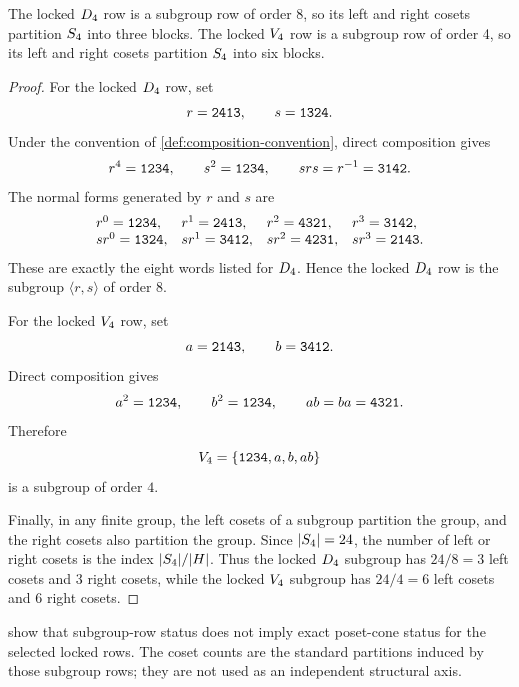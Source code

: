 \begin{corollary}
\label{cor:d4-v4-subgroup-cosets}
The locked \(D_4\) row is a subgroup row of order 8, so its left and right cosets partition \(S_4\) into three blocks. The locked \(V_4\) row is a subgroup row of order 4, so its left and right cosets partition \(S_4\) into six blocks.
\end{corollary}

\begin{proof}
For the locked \(D_4\) row, set
\[
  r=\texttt{2413},\qquad s=\texttt{1324}.
\]
Under the convention of \cref{def:composition-convention}, direct composition gives
\[
  r^4=\texttt{1234},\qquad s^2=\texttt{1234},\qquad srs=r^{-1}=\texttt{3142}.
\]
The normal forms generated by \(r\) and \(s\) are
\[
\begin{array}{llll}
r^0=\texttt{1234}, & r^1=\texttt{2413}, & r^2=\texttt{4321}, & r^3=\texttt{3142},\\
sr^0=\texttt{1324}, & sr^1=\texttt{3412}, & sr^2=\texttt{4231}, & sr^3=\texttt{2143}.
\end{array}
\]
These are exactly the eight words listed for \(D_4\). Hence the locked \(D_4\) row is the subgroup \(\langle r,s\rangle\) of order \(8\).

For the locked \(V_4\) row, set
\[
  a=\texttt{2143},\qquad b=\texttt{3412}.
\]
Direct composition gives
\[
  a^2=\texttt{1234},\qquad b^2=\texttt{1234},\qquad ab=ba=\texttt{4321}.
\]
Therefore
\[
  V_4=\{\texttt{1234},a,b,ab\}
\]
is a subgroup of order \(4\).

Finally, in any finite group, the left cosets of a subgroup partition the group, and the right cosets also partition the group. Since \(|S_4|=24\), the number of left or right cosets is the index \(|S_4|/|H|\). Thus the locked \(D_4\) subgroup has \(24/8=3\) left cosets and \(3\) right cosets, while the locked \(V_4\) subgroup has \(24/4=6\) left cosets and \(6\) right cosets.
\end{proof}

\begin{remark}
\label{rem:d4-v4-separation-visible}
 show that subgroup-row status does not imply exact poset-cone status for the selected locked rows. The coset counts are the standard partitions induced by those subgroup rows; they are not used as an independent structural axis.
\end{remark}
